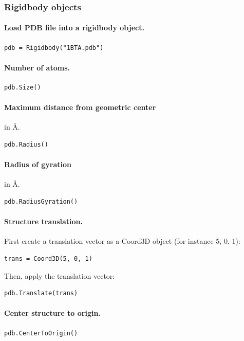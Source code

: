 \documentclass[12pt,a4paper]{article}
\begin{document}
\subsubsection{Rigidbody objects}

\paragraph{Load PDB file into a rigidbody object.}
\begin{verbatim}
pdb = Rigidbody("1BTA.pdb")
\end{verbatim}

\paragraph{Number of atoms.}
\begin{verbatim}
pdb.Size()
\end{verbatim}

\paragraph{Maximum distance from geometric center} in \AA.
\begin{verbatim}
pdb.Radius()
\end{verbatim}

\paragraph{Radius of gyration} in \AA.
\begin{verbatim}
pdb.RadiusGyration()
\end{verbatim}


\paragraph{Structure translation.}
First create a translation vector as a Coord3D object (for instance 5, 0, 1):
\begin{verbatim}
trans = Coord3D(5, 0, 1)
\end{verbatim}
Then, apply the translation vector:
\begin{verbatim}
pdb.Translate(trans)
\end{verbatim}


\paragraph{Center structure to origin.}
\begin{verbatim}
pdb.CenterToOrigin()
\end{verbatim}
\end{document}
